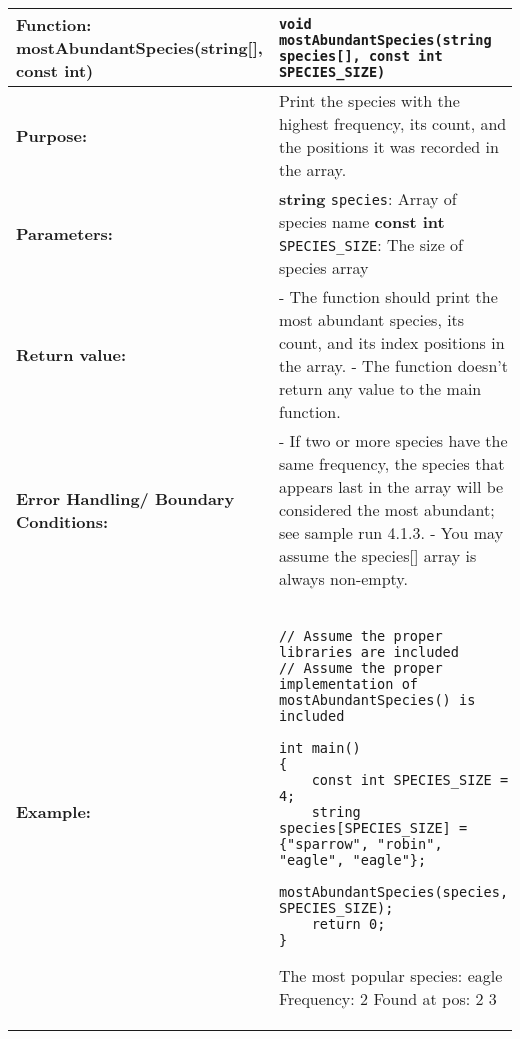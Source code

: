 \newpage
\begin{longtable}[H]{|p{1.7in}|p{4.0in}|} \hline
        \textbf{Function:} mostAbundantSpecies(string[], const int) & \texttt{void mostAbundantSpecies(string species[], const int SPECIES_SIZE)}
        \\ \hline
        \textbf{Purpose:}  & Print the species with the highest frequency, its count, and the positions it was recorded in the array.\\ \hline
        \textbf{Parameters:} &  
        \textbf{string} \texttt{species}: Array of species name \newline
        \textbf{const int} \texttt{SPECIES\_SIZE}: The size of species array
\\ \hline
        \textbf{Return value:} & - The function should print the most abundant species, its count, and its index positions in the array. \newline
        - The function doesn't return any value to the main function. \\ \hline
\textbf{Error Handling/ Boundary Conditions:} &  - If two or more species have the same frequency, the species that appears last in the array will be considered the most abundant; see sample run 4.1.3. 
\newline
- You may assume the species[] array is always non-empty. 
\\ \hline
        \textbf{Example:} & 
        \begin{example}
        \begin{verbatim}

// Assume the proper libraries are included
// Assume the proper implementation of mostAbundantSpecies() is included

int main()
{
    const int SPECIES_SIZE = 4;
    string species[SPECIES_SIZE] = {"sparrow", "robin", "eagle", "eagle"};
    mostAbundantSpecies(species, SPECIES_SIZE);
    return 0;
}
        \end{verbatim}
        \end{example}

        \begin{sample}
The most popular species: eagle \newline
Frequency: 2 \newline
Found at pos: 2 3 \newline
        \end{sample}
             \\ \hline
\end{longtable}

